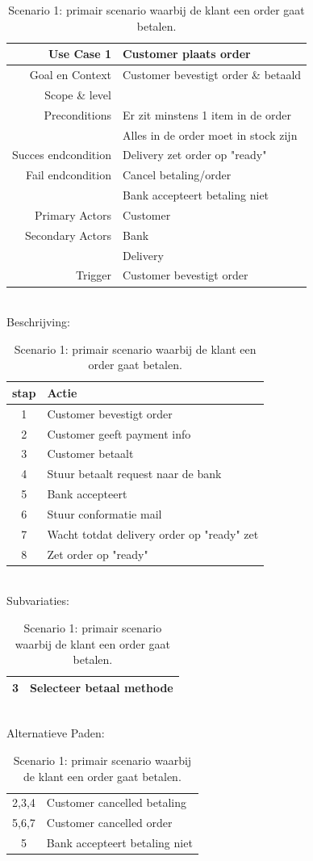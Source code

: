 \documentclass[•]{article}
\begin{document}
\begin{table}
\centering
\begin{tabular}{|rl|}
\hline
Use Case 1 & Customer plaats order \\
\hline
Goal en Context 		& Customer bevestigt order \& betaald\\
Scope \& level 			& \\
Preconditions			& Er zit minstens 1 item in de order\\
						& Alles in de order moet in stock zijn\\
Succes endcondition 	& Delivery zet order op "ready"\\
Fail endcondition		& Cancel betaling/order\\
						& Bank accepteert betaling niet\\
Primary Actors			& Customer\\
Secondary Actors		& Bank\\
						& Delivery\\
Trigger					& Customer bevestigt order\\
\hline
\end{tabular}
\\
Beschrijving:
\\
\begin{tabular}{|cl|}
\hline
stap	& Actie\\
\hline
1		& Customer bevestigt order\\
2		& Customer geeft payment info\\
3		& Customer betaalt\\
4		& Stuur betaalt request naar de bank\\
5		& Bank accepteert\\
6		& Stuur conformatie mail\\
7		& Wacht totdat delivery order op "ready" zet\\
8		& Zet order op "ready"\\
\hline
\end{tabular}
\\
Subvariaties:
\\
\begin{tabular}{|cl|}
\hline
3		& Selecteer betaal methode\\
\hline
\end{tabular}
\\
Alternatieve Paden:
\\
\begin{tabular}{|cl|}
\hline
2,3,4 	& Customer cancelled betaling \\
5,6,7 	& Customer cancelled order	\\
5		& Bank accepteert betaling niet\\
\hline
\end{tabular}
\caption{Scenario 1: primair scenario waarbij de klant een order gaat betalen.}
\label{Prim_scenario_1}
\end{table}
\end{document}
